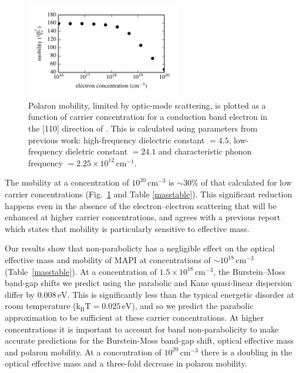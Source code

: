 \begin{figure}[tb] \centering
\includegraphics[width=0.6\textwidth]{./figures/ch4/mobility.pdf}
\caption[Polaron mobility as a function of carrier concentration]{\label{mobility_plot} Polaron mobility, limited by optic-mode scattering, is plotted as a function of carrier concentration for a conduction band electron in the [110] direction of . This is calculated using parameters from previous work:\autocite{Frost2017b} high-frequency dielectric constant $=4.5$, low-frequency dieletric constant $=24.1$ and characteristic phonon frequency $=2.25\times10^{12}\,\mathrm{cm}^{-1}$.}
\end{figure}

The mobility at a concentration of $10^{20}\,\mathrm{cm}^{-3}$ is $\sim30\%$ of that calculated for low carrier concentrations (Fig.\ \ref{mobility_plot} and Table \ref{masstable}).
This significant reduction happens even in the absence of the electron--electron scattering that will be enhanced at higher carrier concentrations,
and agrees with a previous report which states that mobility is particularly sensitive to effective mass.\autocite{Ponce2018} 

Our results show that non-parabolicty has a negligible effect on the optical effective mass and mobility of MAPI at concentrations of $\sim10^{18}\,\mathrm{cm}^{-3}$ (Table\ \ref{masstable}).
At a concentration of $1.5\!\times\!10^{18}\,\mathrm{cm}^{-3}$, the Burstein--Moss band-gap shifts we predict using the parabolic and Kane quasi-linear dispersion differ by $0.008\,\text{eV}$.
This is significantly less than the typical energetic disorder at room temperature ($\mathrm{k_BT}=0.025\,\mathrm{eV}$), and so we predict the parabolic approximation to be sufficient at these carrier concentrations.
At higher concentrations it is important to account for band non-parabolicity to make accurate predictions for the Burstein-Moss band-gap shift, optical effective mass and polaron mobility. 
At a concentration of $10^{20}\,\mathrm{cm}^{-3}$ there is a doubling in the optical effective mass and a three-fold decrease in polaron mobility. 


